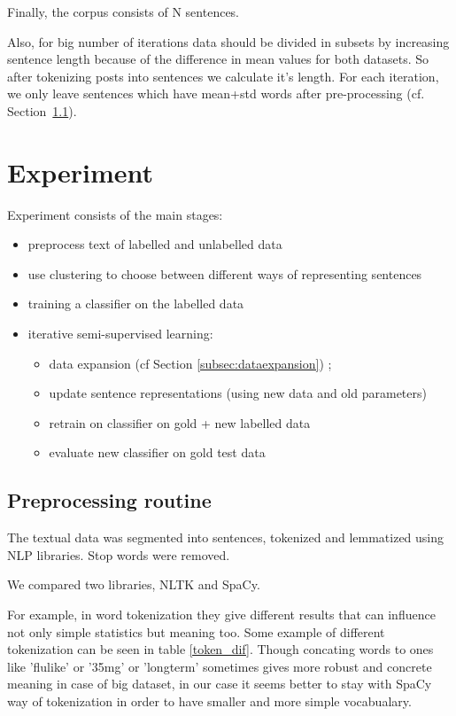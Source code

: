 \documentclass[11pt]{article}
\begin{document}
Finally, the corpus consists of N  sentences. 

Also, for big number of iterations data should be divided in subsets by increasing sentence length because of the difference in mean values for both datasets. So after tokenizing posts into sentences we calculate it's length. For each iteration, we only leave sentences which have mean+std words after pre-processing (cf. Section~\ref{subsec:preprocessing}).


\section{Experiment}
\label{sec:xps}

Experiment consists of the main stages:

\begin{itemize}
\item preprocess text of labelled and unlabelled data
\item use clustering to choose between different ways of representing sentences
\item training a classifier on the labelled data
\item iterative semi-supervised learning:
  \begin{itemize}
  \item data expansion (cf Section \ref{subsec:dataexpansion}) ; 
  \item update sentence representations (using new data and old parameters)
  \item retrain on classifier on gold + new labelled data
  \item evaluate new classifier on gold test data
\end{itemize}
\end{itemize}

\subsection{Preprocessing routine}
\label{subsec:preprocessing}
The textual data was segmented into sentences, tokenized and lemmatized using NLP
libraries. Stop words were removed.

We compared two libraries, NLTK and SpaCy.

For example, in word tokenization they give different results that can influence not only simple statistics but meaning too. Some example of different tokenization can be seen in table \ref{token_dif}. Though concating words to ones like 'flulike' or '35mg' or 'longterm' sometimes gives more robust and concrete meaning in case of big dataset, in our case it seems better to stay with SpaCy way of tokenization in order to have smaller and more simple vocabualary.
\end{document}
